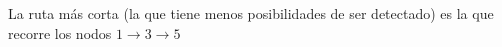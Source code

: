 \begin{homeworkProblem}
\begin{tikzpicture}[shorten >=2pt,,line width=0.4mm,node distance=2cm,on grid,auto]
\end{tikzpicture}


La ruta más corta (la que tiene menos posibilidades de ser detectado) es la que recorre los nodos $1\rightarrow3\rightarrow5$
%
%
%


\end{homeworkProblem}